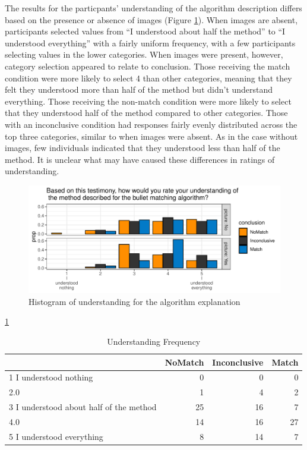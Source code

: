 \documentclass[print]{nuthesis}
\begin{document}
The results for the particpants' understanding of the algorithm description differs based on the presence or absence of images (Figure \ref{fig:algunder}).
When images are absent, participants selected values from ``I understood about half the method'' to ``I understood everything'' with a fairly uniform frequency, with a few participants selecting values in the lower categories.
When images were present, however, category selection appeared to relate to conclusion.
Those receiving the match condition were more likely to select 4 than other categories, meaning that they felt they understood more than half of the method but didn't understand everything.
Those receiving the non-match condition were more likely to select that they understood half of the method compared to other categories.
Those with an inconclusive condition had responses fairly evenly distributed across the top three categories, similar to when images were absent.
As in the case without images, few individuals indicated that they understood less than half of the method.
It is unclear what may have caused these differences in ratings of understanding.

\begin{figure}

{\centering \includegraphics[width=\linewidth]{thesis_files/figure-latex/algunder-1} 

}

\caption{Histogram of understanding for the algorithm explanation}\label{fig:algunder}
\end{figure}

 \ref{tab:undertb}

\begin{table}

\caption{\label{tab:undertb}Understanding Frequency}
\centering
\begin{tabular}[t]{l|r|r|r}
\hline
  & NoMatch & Inconclusive & Match\\
\hline
1
I
understood
nothing & 0 & 0 & 0\\
\hline
2.0 & 1 & 4 & 2\\
\hline
3
I
understood
about
half
of
the
method & 25 & 16 & 7\\
\hline
4.0 & 14 & 16 & 27\\
\hline
5
I
understood
everything & 8 & 14 & 7\\
\hline
\end{tabular}
\end{table}
\end{document}

